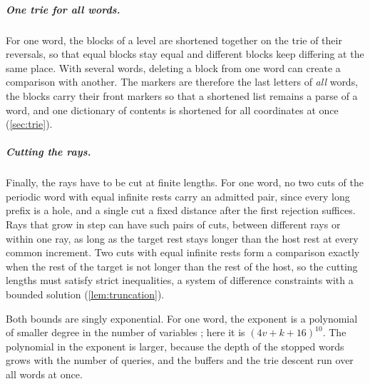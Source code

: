 \subparagraph*{One trie for all words.}
For one word, the blocks of a level are shortened together on the trie of their reversals,
so that equal blocks stay equal and different blocks keep differing at the same place. With
several words, deleting a block from one word can create a comparison with another. The
markers are therefore the last letters of \emph{all} words, the blocks carry their front
markers so that a shortened list remains a parse of a word, and one dictionary of contents
is shortened for all coordinates at once (\cref{sec:trie}).

\subparagraph*{Cutting the rays.}
Finally, the rays have to be cut at finite lengths. For one word, no two cuts of the
periodic word with equal infinite rests carry an admitted pair, since every long prefix is a
hole, and a single cut a fixed distance after the first rejection suffices. Rays that grow
in step can have such pairs of cuts, between different rays or within one ray, as long as
the target rest stays longer than the host rest at every common increment. Two cuts with
equal infinite rests form a comparison exactly when the rest of the target is not longer
than the rest of the host, so the cutting lengths must satisfy strict inequalities, a
system of difference constraints with a bounded solution (\cref{lem:truncation}).

Both bounds are singly exponential. For one word, the exponent is a polynomial of smaller
degree in the number of variables \cite{NSSE26}; here it is $(4v+k+16)^{10}$. The
polynomial in the exponent is larger, because the depth of the stopped words grows with the
number of queries, and the buffers and the trie descent run over all words at once.
